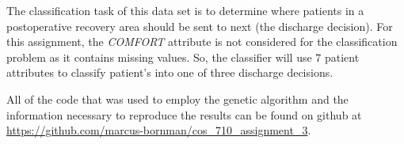 The classification task of this data set is to determine where patients in a postoperative recovery area should be sent to next (the discharge decision). For this assignment, the \emph{COMFORT} attribute is not considered for the classification problem as it contains missing values. So, the classifier will use 7 patient attributes to classify patient's into one of three discharge decisions.

All of the code that was used to employ the genetic algorithm and the information necessary to reproduce the results can be found on github at \url{https://github.com/marcus-bornman/cos_710_assignment_3}.
